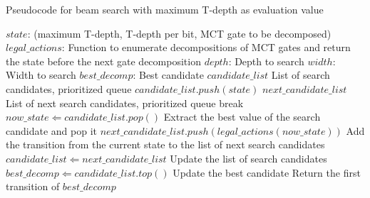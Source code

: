 \begin{algorithm}[tbp]
\caption{Pseudocode for beam search with maximum T-depth as evaluation value}
\label{alg:mct_beam}
\begin{algorithmic}[1]
\Require $state$: (maximum T-depth, T-depth per bit, MCT gate to be decomposed)
\Require $legal\_actions$: Function to enumerate decompositions of MCT gates and return the state before the next gate decomposition
\Require $depth$: Depth to search
\Require $width$: Width to search
\State $best\_decomp$: Best candidate
\State $candidate\_list$ List of search candidates, prioritized queue
\State $candidate\_list.push(state)$
\State $next\_candidate\_list$ List of next search candidates, prioritized queue
\State break
\EndIf
\State $now\_state \Leftarrow candidate\_list.pop()$ Extract the best value of the search candidate and pop it
\State $next\_candidate\_list.push(legal\_actions(now\_state))$ Add the transition from the current state to the list of next search candidates
\EndFor
\State $candidate\_list \Leftarrow next\_candidate\_list$ Update the list of search candidates
\State $best\_decomp \Leftarrow candidate\_list.top()$ Update the best candidate
\EndFor
\State \Return Return the first transition of $best\_decomp$
\end{algorithmic}
\end{algorithm}
